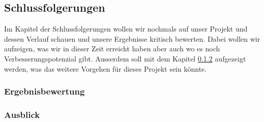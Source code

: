 \subsection{Schlussfolgerungen}
Im Kapitel der Schlussfolgerungen wollen wir nochmals auf unser Projekt und dessen Verlauf schauen und unsere Ergebnisse kritisch bewerten. Dabei wollen wir aufzeigen, was wir in dieser Zeit erreicht haben aber auch wo es noch Verbesserungspotenzial gibt. Ausserdem soll mit dem Kapitel \ref{subsub:Ausblick} aufgezeigt werden, was das weitere Vorgehen für dieses Projekt sein könnte.

\subsubsection{Ergebnisbewertung}



\subsubsection{Ausblick}
\label{subsub:Ausblick}



